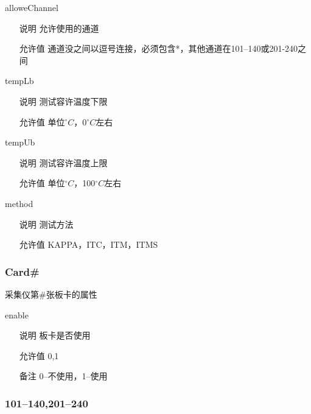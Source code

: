 \begin{definition}{alloweChannel}{}
    \begin{itemize}
        \item[说明] 允许使用的通道
        \item[允许值] 通道没之间以逗号连接，必须包含*，其他通道在101--140或201-240之间
    \end{itemize}
\end{definition}

\begin{definition}{tempLb}{}
    \begin{itemize}
        \item[说明] 测试容许温度下限
        \item[允许值] 单位$^{\circ}C$，0$^{\circ}C$左右
    \end{itemize}
\end{definition}

\begin{definition}{tempUb}{}
    \begin{itemize}
        \item[说明] 测试容许温度上限
        \item[允许值] 单位$^{\circ}C$，100$^{\circ}C$左右
    \end{itemize}
\end{definition}

\begin{definition}{method}{}
    \begin{itemize}
        \item[说明] 测试方法
        \item[允许值] KAPPA，ITC，ITM，ITMS
    \end{itemize}
\end{definition}

\subsubsection*{Card\#}
采集仪第\#张板卡的属性
\begin{definition}{enable}{}
    \begin{itemize}
        \item[说明] 板卡是否使用
        \item[允许值] 0,1
        \item[备注] 0--不使用，1--使用 
    \end{itemize}
\end{definition}

\subsubsection*{101--140,201--240}

